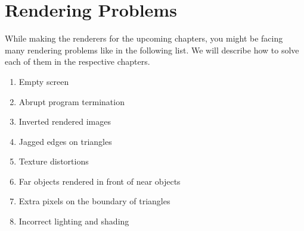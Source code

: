 \section{Rendering Problems}
While making the renderers for the upcoming chapters, you might be facing many rendering problems like in the following list. We will describe how to solve each of them in the respective chapters.
\vspace{1em} 
\begin{enumerate}
	\item Empty screen
    \item Abrupt program termination 
    \item Inverted rendered images
    \item Jagged edges on triangles
    \item Texture distortions
    \item Far objects rendered in front of near objects
    \item Extra pixels on the boundary of triangles
    \item Incorrect lighting and shading
\end{enumerate}
\vspace{1em} 

\clearpage